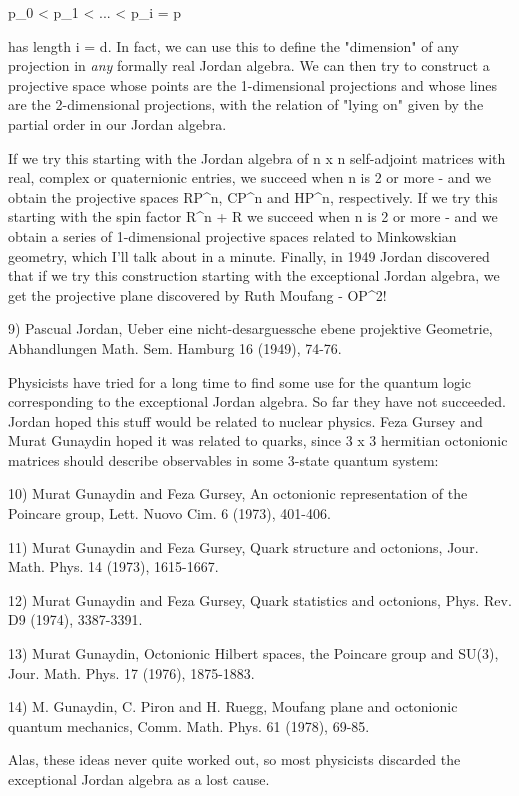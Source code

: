    p_{0} < p_{1} < ... < p_{i} = p  

has length i = d.  In fact, we can use this to define the "dimension"
of any projection in \emph{any} formally real Jordan algebra.  We can then try
to construct a projective space whose points are the 1-dimensional
projections and whose lines are the 2-dimensional projections, with the
relation of "lying on" given by the partial order in our Jordan algebra.

If we try this starting with the Jordan algebra of n x n self-adjoint
matrices with real, complex or quaternionic entries, we succeed when n
is 2 or more - and we obtain the projective spaces RP^{n},
CP^{n} and HP^{n}, respectively.  If we try this
starting with the spin factor R^{n} + R we succeed when n is 2
or more - and we obtain a series of 1-dimensional projective spaces
related to Minkowskian geometry, which I'll talk about in a minute.
Finally, in 1949 Jordan discovered that if we try this construction
starting with the exceptional Jordan algebra, we get the projective
plane discovered by Ruth Moufang - OP^{2}!

9) Pascual Jordan, Ueber eine nicht-desarguessche ebene projektive
Geometrie, Abhandlungen Math. Sem. Hamburg 16 (1949), 74-76.

Physicists have tried for a long time to find some use for the quantum
logic corresponding to the exceptional Jordan algebra.  So far they have
not succeeded.  Jordan hoped this stuff would be related to nuclear
physics.  Feza Gursey and Murat Gunaydin hoped it was related to
quarks, since 3 x 3 hermitian octonionic matrices should describe 
observables in some 3-state quantum system:

10) Murat Gunaydin and Feza Gursey, An octonionic representation of
the Poincare group, Lett. Nuovo Cim. 6 (1973), 401-406.

11) Murat Gunaydin and Feza Gursey, Quark structure and octonions,
Jour. Math. Phys. 14 (1973), 1615-1667.

12) Murat Gunaydin and Feza Gursey, Quark statistics and octonions,
Phys. Rev. D9 (1974), 3387-3391.

13) Murat Gunaydin, Octonionic Hilbert spaces, the Poincare group and
SU(3), Jour. Math. Phys. 17 (1976), 1875-1883.

14) M. Gunaydin, C. Piron and H. Ruegg, Moufang plane and octonionic 
quantum mechanics, Comm. Math. Phys. 61 (1978), 69-85.

Alas, these ideas never quite worked out, so most physicists discarded
the exceptional Jordan algebra as a lost cause.

